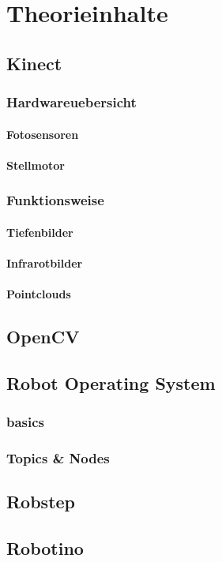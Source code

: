 
\chapter{Theorieinhalte}
	\section{Kinect}
		\subsection{Hardwareuebersicht}
			\subsubsection{Fotosensoren}
			\subsubsection{Stellmotor}
		\subsection{Funktionsweise}
			\subsubsection{Tiefenbilder}
			\subsubsection{Infrarotbilder}
			\subsubsection{Pointclouds}
	\section{OpenCV}
	\section{Robot Operating System}
		\subsection{basics}
		\subsection{Topics \& Nodes}
	\section{Robstep}
	\section{Robotino}